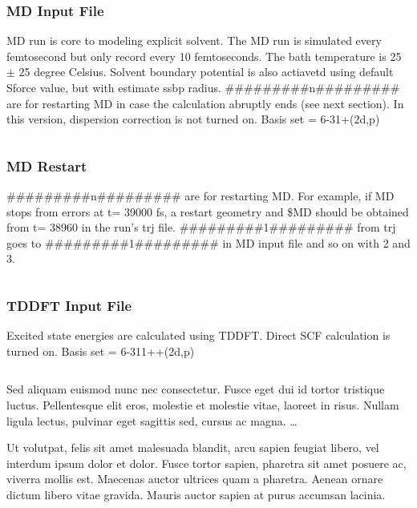 \documentclass[
journal=jacsat, %
manuscript=article]{achemso}
\begin{document}
		\subsubsection{MD Input File}
			 MD run is core to modeling explicit solvent. The MD run is simulated every femtosecond but only record every 10 femtoseconds. The bath temperature is 25 $\pm$ 25 degree Celsius. Solvent boundary potential is also actiavetd using default Sforce value, but with estimate ssbp radius. \#\#\#\#\#\#\#\#\#n\#\#\#\#\#\#\#\#\# are for restarting MD in case the calculation abruptly ends (see next section). In this version, dispersion correction is not turned on. Basis set = 6-31+(2d,p)
			 \inputminted[linenos, breaklines, baselinestretch=1, fontsize=\small]{Perl}{../GAMESSinpSample/MD_aniline32.inp}
			 
		\subsubsection{MD Restart}
		\#\#\#\#\#\#\#\#\#n\#\#\#\#\#\#\#\#\# are for restarting MD. For example, if MD stops from errors at t= 39000 fs, a restart geometry and \$MD should be obtained from t= 38960 in the run's trj file. \#\#\#\#\#\#\#\#\#1\#\#\#\#\#\#\#\#\# from trj goes to \#\#\#\#\#\#\#\#\#1\#\#\#\#\#\#\#\#\# in MD input file and so on with 2 and 3.
		\inputminted[linenos, breaklines, baselinestretch=1, fontsize=\small]{Perl}{../GAMESSinpSample/MD_aniline32.trj}
		
		\subsubsection{TDDFT Input File}
			Excited state energies are calculated using TDDFT. Direct SCF calculation is turned on. Basis set = 6-311++(2d,p)
			\inputminted[linenos, breaklines, baselinestretch=1, fontsize=\small]{Perl}{../GAMESSinpSample/TDDFT_aniline32_15010.inp}


\acknowledgement

Sed aliquam euismod nunc nec consectetur. Fusce eget dui id tortor tristique luctus. Pellentesque elit eros, molestie et molestie vitae, laoreet in risus. Nullam ligula lectus, pulvinar eget sagittis sed, cursus ac magna. \ldots


\suppinfo

Ut volutpat, felis sit amet malesuada blandit, arcu sapien feugiat libero, vel interdum ipsum dolor et dolor. Fusce tortor sapien, pharetra sit amet posuere ac, viverra mollis est. Maecenas auctor ultrices quam a pharetra. Aenean ornare dictum libero vitae gravida. Mauris auctor sapien at purus accumsan lacinia.


\end{document}
